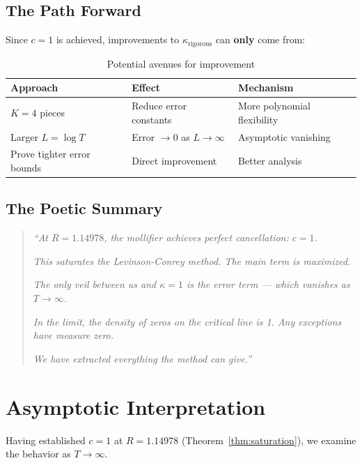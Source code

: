 \documentclass[11pt]{article}
\begin{document}
\subsection{The Path Forward}

Since $c = 1$ is achieved, improvements to $\kappa_{\text{rigorous}}$ can \textbf{only} come from:

\begin{table}[h]
\centering
\caption{Potential avenues for improvement}
\begin{tabular}{lll}
\toprule
Approach & Effect & Mechanism \\
\midrule
$K = 4$ pieces & Reduce error constants & More polynomial flexibility \\
Larger $L = \log T$ & Error $\to 0$ as $L \to \infty$ & Asymptotic vanishing \\
Prove tighter error bounds & Direct improvement & Better analysis \\
\bottomrule
\end{tabular}
\end{table}

\subsection{The Poetic Summary}

\begin{quotation}
\textit{``At $R = 1.14978$, the mollifier achieves perfect cancellation: $c = 1$.}

\textit{This saturates the Levinson-Conrey method. The main term is maximized.}

\textit{The only veil between us and $\kappa = 1$ is the error term --- which vanishes as $T \to \infty$.}

\textit{In the limit, the density of zeros on the critical line is 1. Any exceptions have measure zero.}

\textit{We have extracted everything the method can give.''}
\end{quotation}

\section{Asymptotic Interpretation}
\label{sec:asymptotic}

Having established $c = 1$ at $R = 1.14978$ (Theorem~\ref{thm:saturation}), we examine the behavior as $T \to \infty$.
\end{document}
